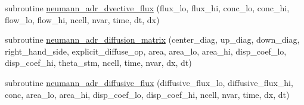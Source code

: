 \begin{CompactItemize}
subroutine \hyperlink{a00073_9163250ea77d1da6ca6c76251c24060e}{neumann\_\-adr\_\-dvective\_\-flux} (flux\_\-lo, flux\_\-hi, conc\_\-lo, conc\_\-hi, flow\_\-lo, flow\_\-hi, ncell, nvar, time, dt, dx)
\item 
subroutine \hyperlink{a00073_63a873ba17146675e814ba8aa96747d5}{neumann\_\-adr\_\-diffusion\_\-matrix} (center\_\-diag, up\_\-diag, down\_\-diag, right\_\-hand\_\-side, explicit\_\-diffuse\_\-op, area, area\_\-lo, area\_\-hi, disp\_\-coef\_\-lo, disp\_\-coef\_\-hi, theta\_\-stm, ncell, time, nvar, dx, dt)
\item 
subroutine \hyperlink{a00073_d74dc597fa06e3a626df2dd9a70c8d9d}{neumann\_\-adr\_\-diffusive\_\-flux} (diffusive\_\-flux\_\-lo, diffusive\_\-flux\_\-hi, conc, area\_\-lo, area\_\-hi, disp\_\-coef\_\-lo, disp\_\-coef\_\-hi, ncell, nvar, time, dx, dt)
\end{CompactItemize}
